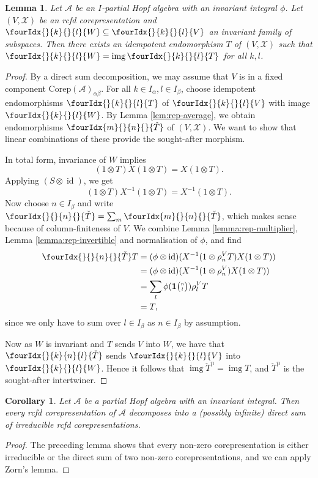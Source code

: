 \documentclass[10pt]{article}
\DeclareMathOperator{\id}{id}
\DeclareMathOperator{\img}{img}
\newcommand{\Corep}{\mathrm{Corep}}
\newcommand{\Grt}[3]{#1{\tiny{\begin{pmatrix} #2\\#3\end{pmatrix}}}}
\newcommand{\UnitC}[2]{\Grt{\mathbf{1}}{#1}{#2}}
\newcommand{\Gr}[5]{\fourIdx{#2}{#4}{#3}{#5}{#1}}%
\newcommand{\Gru}[3]{\Gr{#1}{}{}{#2}{#3}}
\newcommand{\Grd}[3]{\Gr{#1}{#2}{#3}{}{}}
\newtheorem{Lem}[Theorem]{Lemma}
\newtheorem{Cor}[Theorem]{Corollary}
\theoremstyle{definition}
\numberwithin{equation}{section}
\begin{document}
\begin{Lem}
  Let $\mathscr{A}$ be an $I$-partial Hopf algebra with an invariant integral $\phi$.
  Let $(V,\mathscr{X})$ be an rcfd corepresentation
  and $\Gru{W}{k}{l} \subseteq \Gru{V}{k}{l}$ an invariant family of
  subspaces. Then there exists an idempotent endomorphism $T$ of
  $(V,\mathscr{X})$ such that $\Gru{W}{k}{l}=\img\Gru{T}{k}{l}$ for
  all $k,l$.
\end{Lem}
\begin{proof}
By a direct sum decomposition, we may assume that $V$ is in a fixed component $\Corep(\mathscr{A})_{\alpha\beta}$. For all $k\in I_{\alpha},l\in I_{\beta}$, choose idempotent endomorphisms $\Gru{T}{k}{l}$ of $\Gru{V}{k}{l}$
  with image $\Gru{W}{k}{l}$. By Lemma \ref{lem:rep-average}, we obtain
  endomorphisms $\Grd{\check{T}}{m}{n}$ of $(V,\mathscr{X})$. We want to show
  that linear combinations of these provide the sought-after morphism.
  
    In
  total form, invariance of $W$ implies  \[(1 \otimes T)X(1
  \otimes T)=X(1\otimes T).\] Applying
 $(S \otimes \id)$, we get   \[(1 \otimes T)X^{-1}(1
  \otimes T)=X^{-1}(1\otimes T).\]
Now choose $n\in I_{\beta}$ and write $\Grd{\check{T}}{}{n} = \sum_m \Grd{\check{T}}{m}{n}$, which makes sense because of column-finiteness of $V$. We combine  Lemma
  \ref{lemma:rep-multiplier}, Lemma \ref{lemma:rep-invertible} and
  normalisation of $\phi$, and find
  \begin{align*}
    \Grd{\check{T}}{}{n} T &= (\phi \otimes \id)(X^{-1}(1 \otimes
    \rho_{n}^{V}T)X(1 \otimes T)) \\  &= 
     (\phi \otimes \id)(X^{-1}(1 \otimes
    \rho_{n}^{V})X(1 \otimes T)) \\
    &=
  \sum_l \phi(\UnitC{n}{l}) \rho^{V}_{l}T \\& =T,
  \end{align*}
 since we only have to sum over $l\in I_{\beta}$ as $n \in I_{\beta}$ by assumption. 
 
 Now as $W$ is invariant and $T$ sends $V$ into $W$, we have that $\Gr{\check{T}}{}{n}{k}{l}$ sends $\Gru{V}{k}{l}$ into $\Gru{W}{k}{l}$. Hence it follows that $\img{\check{T}^{n}}=\img T$, and $\check{T}^{n}$ is the sought-after intertwiner.
\end{proof}

\begin{Cor}  \label{cor:rep-cosemisimple}%
  Let $\mathscr{A}$ be a partial Hopf algebra with an invariant integral.  Then
  every rcfd corepresentation of $\mathscr{A}$ decomposes into a (possibly infinite) direct
  sum of irreducible rcfd corepresentations.
\end{Cor} 
\begin{proof} 
The preceding lemma shows that  every non-zero corepresentation is either
irreducible or the direct sum of two non-zero corepresentations, and we can apply Zorn's lemma.
\end{proof}
\end{document}
